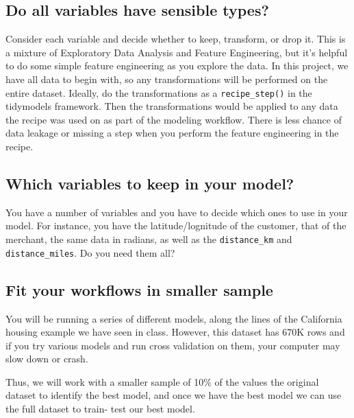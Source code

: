 \documentclass[
]{article}
\begin{document}
\hypertarget{do-all-variables-have-sensible-types}{%
\subsection{Do all variables have sensible
types?}\label{do-all-variables-have-sensible-types}}

Consider each variable and decide whether to keep, transform, or drop
it. This is a mixture of Exploratory Data Analysis and Feature
Engineering, but it's helpful to do some simple feature engineering as
you explore the data. In this project, we have all data to begin with,
so any transformations will be performed on the entire dataset. Ideally,
do the transformations as a \texttt{recipe\_step()} in the tidymodels
framework. Then the transformations would be applied to any data the
recipe was used on as part of the modeling workflow. There is less
chance of data leakage or missing a step when you perform the feature
engineering in the recipe.

\hypertarget{which-variables-to-keep-in-your-model}{%
\subsection{Which variables to keep in your
model?}\label{which-variables-to-keep-in-your-model}}

You have a number of variables and you have to decide which ones to use
in your model. For instance, you have the latitude/lognitude of the
customer, that of the merchant, the same data in radians, as well as the
\texttt{distance\_km} and \texttt{distance\_miles}. Do you need them
all?

\hypertarget{fit-your-workflows-in-smaller-sample}{%
\subsection{Fit your workflows in smaller
sample}\label{fit-your-workflows-in-smaller-sample}}

You will be running a series of different models, along the lines of the
California housing example we have seen in class. However, this dataset
has 670K rows and if you try various models and run cross validation on
them, your computer may slow down or crash.

Thus, we will work with a smaller sample of 10\% of the values the
original dataset to identify the best model, and once we have the best
model we can use the full dataset to train- test our best model.
\end{document}
